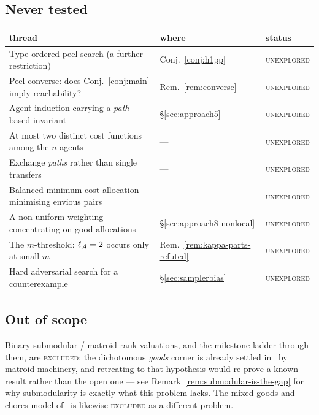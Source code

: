 \subsection*{Never tested}

\begin{center}\small
\begin{tabular}{@{}p{}p{}p{}@{}}
\toprule
thread & where & status \\
\midrule
Type-ordered peel search (a further restriction)
  & Conj.~\ref{conj:h1pp} & \textsc{unexplored} \\
Peel converse: does Conj.~\ref{conj:main} imply reachability?
  & Rem.~\ref{rem:converse} & \textsc{unexplored} \\
Agent induction carrying a \emph{path}-based invariant
  & \S\ref{sec:approach5} & \textsc{unexplored} \\
At most two distinct cost functions among the $n$ agents
  & --- & \textsc{unexplored} \\
Exchange \emph{paths} rather than single transfers
  & --- & \textsc{unexplored} \\
Balanced minimum-cost allocation minimising envious pairs
  & --- & \textsc{unexplored} \\
A non-uniform weighting concentrating on good allocations
  & \S\ref{sec:approach8-nonlocal} & \textsc{unexplored} \\
The $m$-threshold: $\ell_{\mathcal{A}} = 2$ occurs only at small $m$
  & Rem.~\ref{rem:kappa-parts-refuted} & \textsc{unexplored} \\
Hard adversarial search for a counterexample
  & \S\ref{sec:samplerbias} & \textsc{unexplored} \\
\bottomrule
\end{tabular}
\end{center}

\subsection*{Out of scope}

Binary submodular / matroid-rank valuations, and the milestone ladder through
them, are \textsc{excluded}: the dichotomous \emph{goods} corner is already
settled in~\cite{BKNS22} by matroid machinery, and retreating to that hypothesis
would re-prove a known result rather than the open one --- see
Remark~\ref{rem:submodular-is-the-gap} for why submodularity is exactly what this
problem lacks. The mixed goods-and-chores model of~\cite{KMSTY24} is likewise
\textsc{excluded} as a different problem.

